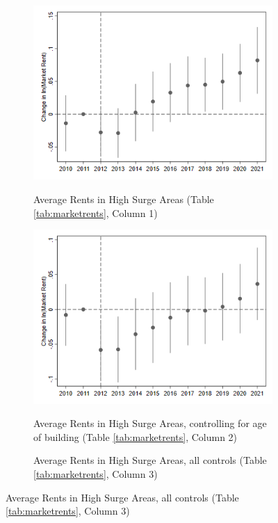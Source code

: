 \documentclass[12pt]{article}
\begin{document}
{{{{{{\begin{figure}[h!]
\begin{center}
\caption{Impact of Hurricane Sandy on Asking Rents}
\begin{subfigure}[b]{0.6\textwidth}
\caption{Average Rents in High Surge Areas (Table \ref{tab:marketrents}, Column 1)}
\includegraphics[scale = 0.6]{Street Easy Rents/R7 High Surge Rent Impacts_nohed.png}
\label{fig:highsurgemkt}
\end{subfigure}
\hfill
\begin{subfigure}[b]{0.6\textwidth}
\caption{Average Rents in High Surge Areas, controlling for age of building (Table \ref{tab:marketrents}, Column 2) }
\includegraphics[scale = 0.6]{Street Easy Rents/R7 High Surge Rent Impacts_nohed_addage.png}
\label{fig:highsurgemktage}
\end{subfigure}
\hfill
\begin{subfigure}[b]{0.6\textwidth}
\caption{Average Rents in High Surge Areas, all controls (Table \ref{tab:marketrents}, Column 3)}

\end{subfigure}
\end{center}
\end{figure}}}}}}}
\end{document}
